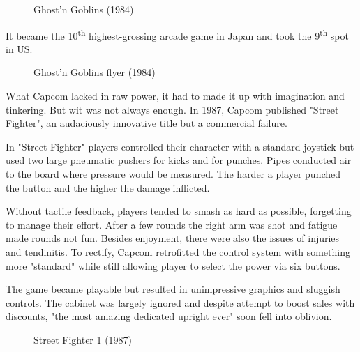 \vfill 

\begin{figure}[H]
\caption*{Ghost’n Goblins (1984)}
\end{figure}
\pagebreak

It became the 10\textsuperscript{th} highest-grossing arcade game in Japan and took the 9\textsuperscript{th} spot in US.
\vfill 
\begin{figure}[H]
\caption*{Ghost’n Goblins flyer (1984)}
\end{figure}
\pagebreak

What Capcom lacked in raw power, it had to made it up with imagination and tinkering. But wit was not always enough. In 1987, Capcom published "Street Fighter", an audaciously innovative title but a commercial failure.

In "Street Fighter" players controlled their character with a standard joystick but used two large pneumatic pushers for kicks and for punches. Pipes conducted air to the board where pressure would be measured. The harder a player punched the button and the higher the damage inflicted.

Without tactile feedback, players tended to smash as hard as possible, forgetting to manage their effort. After a few rounds the right arm was shot and fatigue made rounds not fun. Besides enjoyment, there were also the issues of injuries and tendinitis. To rectify, Capcom retrofitted the control system with something more "standard" while still allowing player to select the power via six buttons. 

The game became playable but resulted in unimpressive graphics and sluggish controls. The cabinet was largely ignored and despite attempt to boost sales with discounts, "the most amazing dedicated upright ever" soon fell into oblivion.


\begin{figure}[H]
\caption*{Street Fighter 1 (1987)}
\end{figure}



